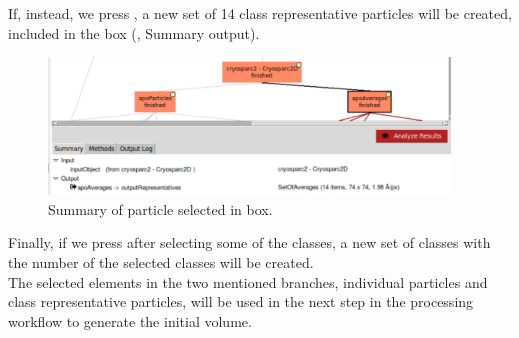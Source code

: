 If, instead, we press , a new set of 14 class representative particles will be created, included in the box  (, Summary output). 

\begin{figure}[H]
  \centering
  \captionsetup{width=.8\linewidth} 
  \includegraphics[width=0.95\textwidth]
  {images/cryosparc2_D.pdf}
  \caption{Summary of particle selected in  box.}
  \label{fig:cryosparc2_apoAverages}
  \end{figure}
  
Finally, if we press  after selecting some of the classes, a new set of classes with the number of the selected classes will be created.\\

The selected elements in the two mentioned branches, individual particles and class representative particles, will be used in the next step in the processing workflow to generate the initial volume.  
